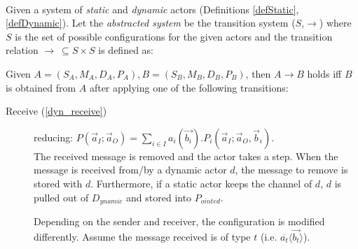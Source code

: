 \documentclass[a4paper]{report}
\numberwithin{algorithm}{chapter}
\begin{document}
\begin{define} \mbox{}\\
Given a system of \emph{static} and \emph{dynamic} actors (Definitions \ref{defStatic}, \ref{defDynamic}).
Let the \emph{abstracted system} be the transition system ($S$,$\rightarrow$)
where $S$ is the set of possible configurations for the given actors and the transition relation $\rightarrow \ \subseteq S \times S$ is defined as:

Given $A = (S_A, M_A, D_A, P_A), B = (S_B, M_B, D_B, P_B)$, then $A \rightarrow B$ holds iff $B$ is obtained from $A$ after applying one of the following transitions:
\begin{description}
\item[Receive (\ref{dyn_receive})] reducing: $P(\vec a_I; \vec a_O) = \sum_{i \in I} a_i (\vec{b_i}).P_i(\vec a_I ;\vec a_O, \vec b_i)$. \\
The received message is removed and the actor takes a step.
When the message is received from/by a dynamic actor $d$, the message to remove is stored with $d$.
Furthermore, if a static actor keeps the channel of $d$, $d$ is pulled out of $D_{ynamic}$ and stored into $P_{ointed}$.

Depending on the sender and receiver, the configuration is modified differently.
Assume the message received is of type $t$ (i.e. $\overline{a_t}\langle \vec{b_t} \rangle$).
\end{description}
\end{define}
\end{document}
